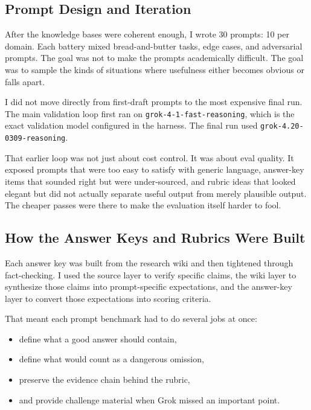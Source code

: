 \documentclass[11pt, a4paper]{article}
\begin{document}
\subsection{Prompt Design and Iteration}

After the knowledge bases were coherent enough, I wrote 30 prompts: 10 per domain. Each battery mixed bread-and-butter tasks, edge cases, and adversarial prompts. The goal was not to make the prompts academically difficult. The goal was to sample the kinds of situations where usefulness either becomes obvious or falls apart.

I did not move directly from first-draft prompts to the most expensive final run. The main validation loop first ran on \texttt{grok-4-1-fast-reasoning}, which is the exact validation model configured in the harness. The final run used \texttt{grok-4.20-0309-reasoning}.

That earlier loop was not just about cost control. It was about eval quality. It exposed prompts that were too easy to satisfy with generic language, answer-key items that sounded right but were under-sourced, and rubric ideas that looked elegant but did not actually separate useful output from merely plausible output. The cheaper passes were there to make the evaluation itself harder to fool.

\subsection{How the Answer Keys and Rubrics Were Built}

Each answer key was built from the research wiki and then tightened through fact-checking. I used the source layer to verify specific claims, the wiki layer to synthesize those claims into prompt-specific expectations, and the answer-key layer to convert those expectations into scoring criteria.

That meant each prompt benchmark had to do several jobs at once:

\begin{itemize}[noitemsep]
    \item define what a good answer should contain,
    \item define what would count as a dangerous omission,
    \item preserve the evidence chain behind the rubric,
    \item and provide challenge material when Grok missed an important point.
\end{itemize}
\end{document}
